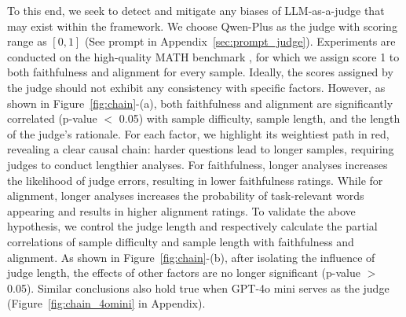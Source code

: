 To this end, we seek to detect and mitigate any biases of LLM-as-a-judge that may exist within the framework. 
We choose Qwen-Plus \citep{qwen} as the judge with scoring range as $[0,1]$ (See prompt in Appendix~\ref{sec:prompt_judge}). Experiments are conducted on the high-quality MATH benchmark \citep{math}, for which we assign score 1 to both faithfulness and alignment for every sample. 
Ideally, the scores assigned by the judge should not exhibit any consistency with specific factors. However, as shown in Figure~\ref{fig:chain}-(a), both faithfulness and alignment are significantly correlated (p-value $<$ 0.05) with sample difficulty, sample length, and the length of the judge’s rationale. 
For each factor, we highlight its weightiest path in red, revealing a clear causal chain: harder questions lead to longer samples, requiring judges to conduct lengthier analyses. For faithfulness, longer analyses increases the likelihood of judge errors, resulting in lower faithfulness ratings. While for alignment, longer analyses increases the probability of task-relevant words appearing and results in higher alignment ratings.
To validate the above hypothesis, we control the judge length and respectively calculate the partial correlations \citep{pengouin} of sample difficulty and sample length with faithfulness and alignment. 
As shown in Figure~\ref{fig:chain}-(b), after isolating the influence of judge length, the effects of other factors are no longer significant (p-value $>$ 0.05). Similar conclusions also hold true when GPT-4o mini \citep{4o} serves as the judge (Figure~\ref{fig:chain_4omini} in Appendix).





